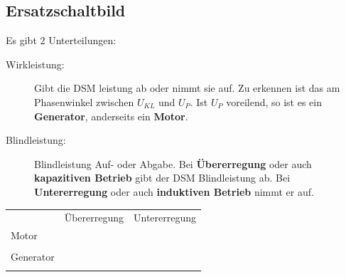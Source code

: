     \subsection{Ersatzschaltbild}
            Es gibt 2 Unterteilungen: \\
            \begin{description}
                \item[Wirkleistung:] Gibt die DSM leistung ab oder nimmt sie auf. Zu erkennen ist das am Phasenwinkel
                zwischen $U_{KL}$ und $U_P$. Ist $U_P$ voreilend, so ist es ein \textbf{Generator}, anderseits ein
                \textbf{Motor}.
                \item[Blindleistung:] Blindleistung Auf- oder Abgabe. Bei \textbf{Übererregung} oder auch \textbf{kapazitiven
                Betrieb} gibt der DSM Blindleistung ab. Bei \textbf{Untererregung} oder auch \textbf{induktiven Betrieb}
                nimmt er auf.
            \end{description}
        \begin{tabular}{lll}
        	& Übererregung & Untererregung \\
        Motor & & \\
        &
         &
        \\
        Generator & & \\
        &
         &
        \\
        \end{tabular}
     
